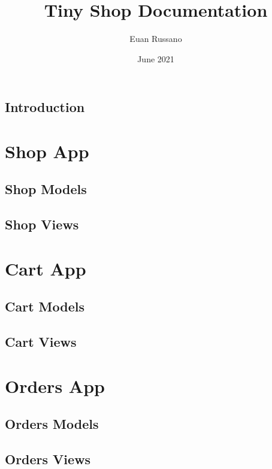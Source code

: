 \documentclass[12pt, letterpaper, oneside]{book}
\title{Tiny Shop Documentation}
\author{Euan Russano}
\date{June 2021}
\begin{document}
	
	\maketitle
	
	\tableofcontents
	
	\chapter{Introduction}
	
	\part{Shop App}
	
	\chapter{Shop Models}
	
	
	\chapter{Shop Views}

	\part{Cart App}
	
	\chapter{Cart Models}

	\chapter{Cart Views}
	
	\part{Orders App}

	\chapter{Orders Models}

	\chapter{Orders Views}

	
\end{document}
